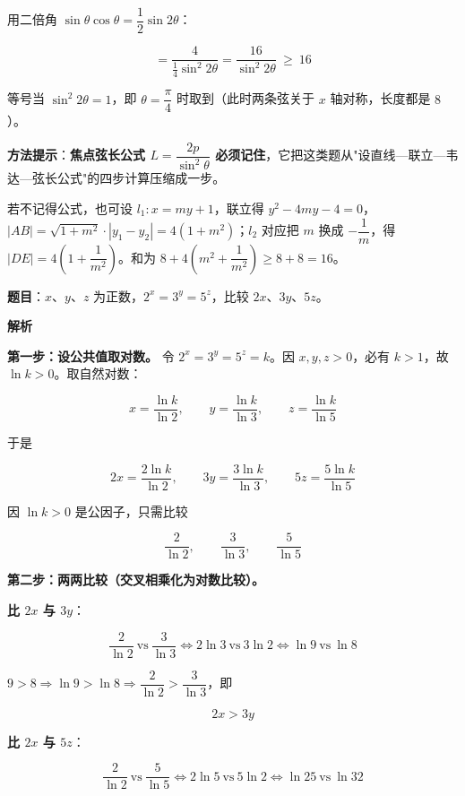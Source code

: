 用二倍角 $\sin\theta\cos\theta=\dfrac12\sin2\theta$：

\[=\frac4{\frac14\sin^{2}2\theta}=\frac{16}{\sin^{2}2\theta}\ \ge\ 16\]

等号当 $\sin^{2}2\theta=1$，即 $\theta=\dfrac\pi4$ 时取到（此时两条弦关于 $x$ 轴对称，长度都是 $8$）。


\begin{gktip}
\textbf{方法提示}：\textbf{焦点弦长公式 $L=\dfrac{2p}{\sin^{2}\theta}$ 必须记住}，它把这类题从"设直线—联立—韦达—弦长公式"的四步计算压缩成一步。

若不记得公式，也可设 $l_1:x=my+1$，联立得 $y^{2}-4my-4=0$，$|AB|=\sqrt{1+m^{2}}\cdot\left|y_1-y_2\right|=4\left(1+m^{2}\right)$；$l_2$ 对应把 $m$ 换成 $-\dfrac1m$，得 $|DE|=4\left(1+\dfrac1{m^{2}}\right)$。和为 $8+4\left(m^{2}+\dfrac1{m^{2}}\right)\ge8+8=16$。
\end{gktip}

\par\medskip


\textbf{题目}：$x$、$y$、$z$ 为正数，$2^{x}=3^{y}=5^{z}$，比较 $2x$、$3y$、$5z$。

\textbf{解析}

\textbf{第一步：设公共值取对数。} 令 $2^{x}=3^{y}=5^{z}=k$。因 $x,y,z>0$，必有 $k>1$，故 $\ln k>0$。取自然对数：

\[x=\frac{\ln k}{\ln2},\qquad y=\frac{\ln k}{\ln3},\qquad z=\frac{\ln k}{\ln5}\]

于是

\[2x=\frac{2\ln k}{\ln2},\qquad 3y=\frac{3\ln k}{\ln3},\qquad 5z=\frac{5\ln k}{\ln5}\]

因 $\ln k>0$ 是公因子，只需比较

\[\frac2{\ln2},\qquad \frac3{\ln3},\qquad \frac5{\ln5}\]

\textbf{第二步：两两比较（交叉相乘化为对数比较）。}

\textbf{比 $2x$ 与 $3y$}：

\[\frac2{\ln2}\ \text{vs}\ \frac3{\ln3}\iff 2\ln3\ \text{vs}\ 3\ln2\iff \ln9\ \text{vs}\ \ln8\]

$9>8\Rightarrow\ln9>\ln8\Rightarrow\dfrac2{\ln2}>\dfrac3{\ln3}$，即

\[2x>3y\]

\textbf{比 $2x$ 与 $5z$}：

\[\frac2{\ln2}\ \text{vs}\ \frac5{\ln5}\iff 2\ln5\ \text{vs}\ 5\ln2\iff \ln25\ \text{vs}\ \ln32\]

